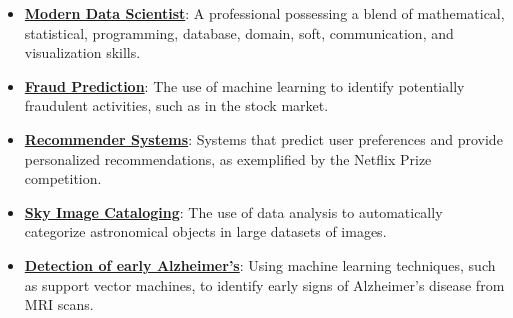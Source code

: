 \documentclass{article}%
\begin{document}
\begin{itemize}[leftmargin=*]
\item \href{https://purdue.brightspace.com/d2l/common/assets/pdfjs-d2l-dist/1.0.14-legacy/web/viewer.html?file=\%2Fcontent\%2Fenforced\%2F1095465-WL.202510.CS24200.LE1\%2F02L1-datas-intro.pdf\%3Fou\%3D1095465\&lang=en-us\&container=d2l-fileviewer-rendered-pdf\&fullscreen=d2l-fileviewer-rendered-pdf-dialog\&height=667#page=9}{\textbf{Modern Data Scientist}}: A professional possessing a blend of mathematical, statistical, programming, database, domain, soft, communication, and visualization skills.%
\item \href{https://purdue.brightspace.com/d2l/common/assets/pdfjs-d2l-dist/1.0.14-legacy/web/viewer.html?file=\%2Fcontent\%2Fenforced\%2F1095465-WL.202510.CS24200.LE1\%2F02L1-datas-intro.pdf\%3Fou\%3D1095465\&lang=en-us\&container=d2l-fileviewer-rendered-pdf\&fullscreen=d2l-fileviewer-rendered-pdf-dialog\&height=667#page=13}{\textbf{Fraud Prediction}}: The use of machine learning to identify potentially fraudulent activities, such as in the stock market.%
\item \href{https://purdue.brightspace.com/d2l/common/assets/pdfjs-d2l-dist/1.0.14-legacy/web/viewer.html?file=\%2Fcontent\%2Fenforced\%2F1095465-WL.202510.CS24200.LE1\%2F02L1-datas-intro.pdf\%3Fou\%3D1095465\&lang=en-us\&container=d2l-fileviewer-rendered-pdf\&fullscreen=d2l-fileviewer-rendered-pdf-dialog\&height=667#page=14}{\textbf{Recommender Systems}}: Systems that predict user preferences and provide personalized recommendations, as exemplified by the Netflix Prize competition.%
\item \href{https://purdue.brightspace.com/d2l/common/assets/pdfjs-d2l-dist/1.0.14-legacy/web/viewer.html?file=\%2Fcontent\%2Fenforced\%2F1095465-WL.202510.CS24200.LE1\%2F02L1-datas-intro.pdf\%3Fou\%3D1095465\&lang=en-us\&container=d2l-fileviewer-rendered-pdf\&fullscreen=d2l-fileviewer-rendered-pdf-dialog\&height=667#page=15}{\textbf{Sky Image Cataloging}}: The use of data analysis to automatically categorize astronomical objects in large datasets of images.%
\item \href{https://purdue.brightspace.com/d2l/common/assets/pdfjs-d2l-dist/1.0.14-legacy/web/viewer.html?file=\%2Fcontent\%2Fenforced\%2F1095465-WL.202510.CS24200.LE1\%2F02L1-datas-intro.pdf\%3Fou\%3D1095465\&lang=en-us\&container=d2l-fileviewer-rendered-pdf\&fullscreen=d2l-fileviewer-rendered-pdf-dialog\&height=667#page=16}{\textbf{Detection of early Alzheimer's}}: Using machine learning techniques, such as support vector machines, to identify early signs of Alzheimer's disease from MRI scans.%

\end{itemize}
\end{document}
